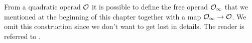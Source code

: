 \documentclass[TFM.tex]{subfiles}
\begin{document}
From a quadratic operad ${\mathcal O}$ it is possible to define the free operad ${\mathcal O}_\infty$ that we mentioned at the beginning of this chapter together with a map ${\mathcal O}_\infty\to{\mathcal O}$. We omit this construction since we don't want to get lost in details. The reader is referred to \cite{Hinich}.



\end{document}
